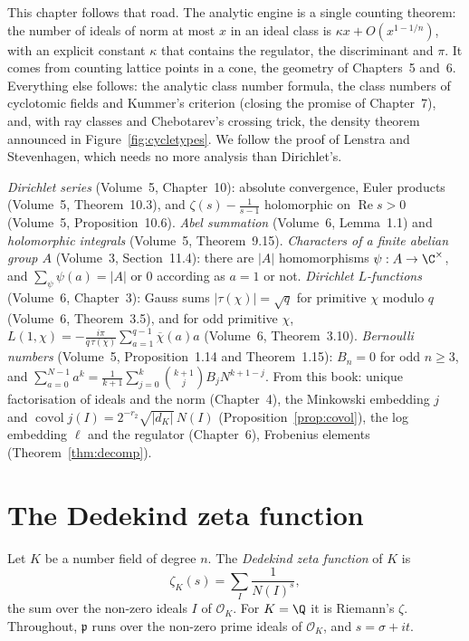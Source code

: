 This chapter follows that road. The analytic engine is a single counting theorem: the number of ideals of norm at most $x$
in an ideal class is $\kappa x+O(x^{1-1/n})$, with an explicit constant $\kappa$ that contains the regulator, the
discriminant and $\pi$. It comes from counting lattice points in a cone, the geometry of Chapters~5 and~6. Everything else
follows: the analytic class number formula, the class numbers of cyclotomic fields and Kummer's criterion (closing the
promise of Chapter~7), and, with ray classes and Chebotarev's crossing trick, the density theorem announced in
Figure~\ref{fig:cycletypes}. We follow the proof of Lenstra and Stevenhagen, which needs no more analysis than Dirichlet's.

\begin{reminder}
\emph{Dirichlet series} (Volume~5, Chapter~10): absolute convergence, Euler products (Volume~5, Theorem~10.3),
and $\zeta(s)-\frac1{s-1}$ holomorphic on $\operatorname{Re}s>0$ (Volume~5, Proposition~10.6).
\emph{Abel summation} (Volume~6, Lemma~1.1) and \emph{holomorphic integrals} (Volume~5, Theorem~9.15).
\emph{Characters of a finite abelian group $A$} (Volume~3, Section~11.4): there are $|A|$ homomorphisms
$\psi:A\to\C^\times$, and $\sum_\psi\psi(a)=|A|$ or $0$ according as $a=1$ or not. \emph{Dirichlet $L$-functions} (Volume~6,
Chapter~3): Gauss sums $|\tau(\chi)|=\sqrt q$ for primitive $\chi$ modulo $q$ (Volume~6, Theorem~3.5), and for odd
primitive $\chi$, $L(1,\chi)=-\frac{i\pi}{q\,\tau(\overline\chi)}\sum_{a=1}^{q-1}\overline\chi(a)a$ (Volume~6,
Theorem~3.10). \emph{Bernoulli numbers} (Volume~5, Proposition~1.14 and Theorem~1.15):
$B_n=0$ for odd $n\ge3$, and $\sum_{a=0}^{N-1}a^k=\frac1{k+1}\sum_{j=0}^k\binom{k+1}jB_jN^{k+1-j}$. From this book: unique
factorisation of ideals and the norm (Chapter~4), the Minkowski embedding $j$ and $\operatorname{covol}j(I)=2^{-r_2}
\sqrt{|d_K|}\,N(I)$ (Proposition~\ref{prop:covol}), the log embedding $\ell$ and the regulator (Chapter~6), Frobenius
elements (Theorem~\ref{thm:decomp}).
\end{reminder}

\section{The Dedekind zeta function}

Let $K$ be a number field of degree $n$. The \emph{Dedekind zeta function} of $K$ is
\[
\zeta_K(s)=\sum_{I}\frac1{N(I)^s},
\]
the sum over the non-zero ideals $I$ of $\mathcal O_K$. For $K=\Q$ it is Riemann's $\zeta$. Throughout, $\mathfrak p$ runs over the
non-zero prime ideals of $\mathcal O_K$, and $s=\sigma+it$.

